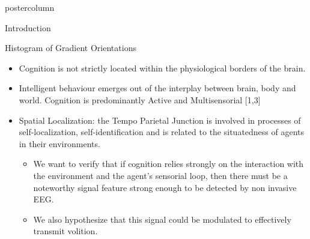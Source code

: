 \documentclass[final]{beamer}
\begin{document}
\begin{frame}
\begin{columns}
\begin{column}{.49\textwidth}
\begin{beamercolorbox}[center,wd=\textwidth]{postercolumn}
\begin{minipage}[T]{.95\textwidth}
{\begin{block}{Introduction}
\begin{itemize}
\begin{itemize}
                \end{itemize}
              \end{itemize}               
            \end{block}
            \vfill
            \begin{block}{Histogram of Gradient Orientations}
                  \begin{itemize}
                  \item Cognition is not strictly located within the physiological borders of the brain.  
                  \item Intelligent behaviour emerges out of the interplay between brain, body and world.  Cognition is predominantly Active and Multisensorial  [1,3]
                  \item Spatial Localization: the Tempo Parietal Junction is involved in processes of self-localization, self-identification and is related to the situatedness of agents in their environments. 
                    \begin{itemize}
                    \item We want to verify that if cognition relies strongly on the interaction with the environment and the agent's sensorial loop, then there must be a noteworthy signal feature strong enough to be detected by non invasive EEG.
                    \item We also hypothesize that this signal could be modulated to effectively transmit volition.
                    \end{itemize}
                  \end{itemize}
                  

\end{block}}
\end{minipage}
\end{beamercolorbox}
\end{column}
\end{columns}
\end{frame}
\end{document}
